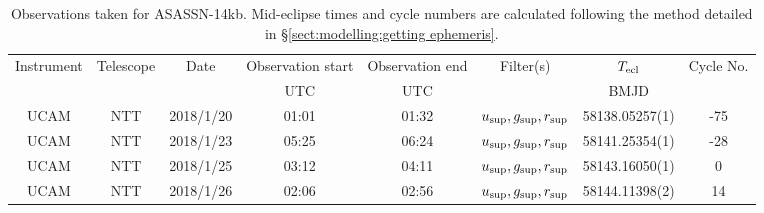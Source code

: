 \begin{table}
	\begin{center}
		\caption{Observations taken for ASASSN-14kb. Mid-eclipse times and cycle numbers are calculated following the method detailed in \S\ref{sect:modelling:getting ephemeris}.}
		\label{table:observing:observation logs ASASSN-14kb}
		\begin{tabular}{cccccccc}
			\hline
			Instrument & Telescope & Date & Observation start & Observation end & Filter(s) & $T_{\rm ecl}$ & Cycle No. \\
			 &  &  & UTC & UTC &  & BMJD &  \\
			\hline
			\hline
			UCAM & NTT & 2018/1/20 & 01:01 & 01:32 & $u_{\rm sup},g_{\rm sup},r_{\rm sup}$ & 58138.05257(1)                                                                                                            &                                         -75 \\
			UCAM & NTT & 2018/1/23 & 05:25 & 06:24 & $u_{\rm sup},g_{\rm sup},r_{\rm sup}$ & 58141.25354(1)                                                                                                            &                                         -28 \\
			UCAM & NTT & 2018/1/25 & 03:12 & 04:11 & $u_{\rm sup},g_{\rm sup},r_{\rm sup}$ & 58143.16050(1)                                                                                                            &                                           0 \\
			UCAM & NTT & 2018/1/26 & 02:06 & 02:56 & $u_{\rm sup},g_{\rm sup},r_{\rm sup}$ & 58144.11398(2)                                                                                                            &                                          14 \\
		   \hline
		\end{tabular}
	\end{center}
\end{table}